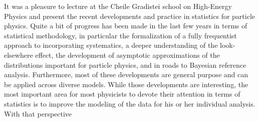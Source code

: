 \documentclass{cernrep}
\begin{document}
It was a pleasure to lecture at the Cheile Gradistei school on High-Energy Physics and present the recent developments and practice in statistics for particle physics.  Quite a bit of progress has been made in the last few years in terms of statistical methodology, in particular the formalization of a fully frequentist approach to incorporating systematics, a deeper understanding of the look-elsewhere effect, the development of asymptotic approximations of the distributions important for particle physics, and in roads to Bayesian reference analysis. Furthermore, most of these developments are general purpose and can be applied across diverse models.   While those developments are interesting, the most important area for most physicists to devote their attention in terms of statistics is to improve the modeling of the data for his or her individual analysis.  With that perspective





%
%
\end{document}
